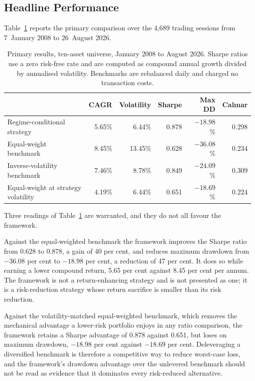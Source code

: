\documentclass{singlecol-new}
\theoremstyle{TH}{
\newtheorem{lemma}{Lemma}
\newtheorem{theorem}[lemma]{Theorem}
\newtheorem{corrolary}[lemma]{Corrolary}
\newtheorem{conjecture}[lemma]{Conjecture}
\newtheorem{proposition}[lemma]{Proposition}
\newtheorem{claim}[lemma]{Claim}
\newtheorem{stheorem}[lemma]{Wrong Theorem}
\newtheorem{algorithm}{Algorithm}
}
\theoremstyle{THrm}{
\newtheorem{definition}{Definition}[section]
\newtheorem{question}{Question}[section]
\newtheorem{remark}{Remark}
\newtheorem{scheme}{Scheme}
}
\theoremstyle{THhit}{
\newtheorem{case}{Case}[section]
}
\begin{document}
\subsection{Headline Performance}

Table~\ref{tab:main} reports the primary comparison over the 4{,}689 trading sessions from
7~January 2008 to 26~August 2026.

\begin{table}[!ht]
\centering
\caption{Primary results, ten-asset universe, January 2008 to August 2026. Sharpe
ratios use a zero risk-free rate and are computed as compound annual growth divided by
annualised volatility. Benchmarks are rebalanced daily and charged no transaction costs.}
\label{tab:main}
\small
\begin{tabular}{p{4.4cm}rrrrr}
\hline
& \textbf{CAGR} & \textbf{Volatility} & \textbf{Sharpe} & \textbf{Max DD} & \textbf{Calmar} \\
\hline
Regime-conditional strategy & 5.65\% & 6.44\% & 0.878 & $-18.98$\% & 0.298 \\
Equal-weight benchmark & 8.45\% & 13.45\% & 0.628 & $-36.08$\% & 0.234 \\
Inverse-volatility benchmark & 7.46\% & 8.78\% & 0.849 & $-24.09$\% & 0.309 \\
Equal-weight at strategy volatility & 4.19\% & 6.44\% & 0.651 & $-18.69$\% & 0.224 \\
\hline
\end{tabular}
\end{table}

Three readings of Table~\ref{tab:main} are warranted, and they do not all favour the framework.

Against the equal-weighted benchmark the framework improves the Sharpe ratio from 0.628
to 0.878, a gain of 40 per cent, and reduces maximum drawdown from $-36.08$ per cent to
$-18.98$ per cent, a reduction of 47 per cent. It does so while earning a lower
compound return, 5.65 per cent against 8.45 per cent per annum. The framework is not a
return-enhancing strategy and is not presented as one; it is a risk-reduction strategy
whose return sacrifice is smaller than its risk reduction.

Against the volatility-matched equal-weighted benchmark, which removes the mechanical
advantage a lower-risk portfolio enjoys in any ratio comparison, the framework retains
a Sharpe advantage of 0.878 against 0.651, but loses on maximum drawdown, $-18.98$ per
cent against $-18.69$ per cent. Deleveraging a diversified benchmark is therefore a
competitive way to reduce worst-case loss, and the framework's drawdown advantage over
the unlevered benchmark should not be read as evidence that it dominates every
risk-reduced alternative.
\end{document}
